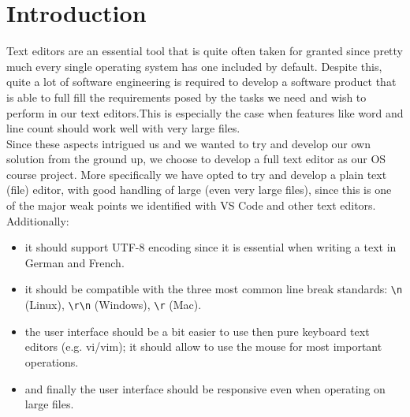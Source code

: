 \section{Introduction}\label{sec:intro}


Text editors are an essential tool that is quite often taken for granted since pretty much every single operating system has one included by default. Despite this, quite a lot of software engineering is required to develop a software product that is able to full fill the requirements posed by the tasks we need and wish to perform in our text editors.This is especially the case when features like word and line count should work well with very large files. \\
Since these aspects intrigued us and we wanted to try and develop our own solution from the ground up, we choose to develop a full text editor as our OS course project. More specifically we have opted to try and develop a plain text (file) editor, with good handling of large (even very large files), since this is one of the major weak points we identified with VS Code and other text editors. 
Additionally: 
\begin{itemize}
\item  it should support UTF-8 encoding since it is essential when writing a text in German and French.
\item it should be compatible with the three most common line break standards: \verb|\n| (Linux), \verb|\r\n| (Windows), \verb|\r| (Mac). 
\item the user interface should be a bit easier to use then pure keyboard text editors (e.g. vi/vim); it should allow to use the mouse for most important operations.
\item and finally the user interface should be responsive even when operating on large files.
\end{itemize}

